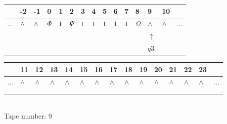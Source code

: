 \documentclass[11pt]{article}
\begin{document}
\begin{table}[H]
\centering
\begin{tabular}{lllllllllllllll}
 & -2 & -1 & 0 & 1 & 2 & 3 & 4 & 5 & 6 & 7 & 8 & 9 & 10 & \\
\hline
$...$ & \multicolumn{1}{|l|}{$\wedge$} & \multicolumn{1}{|l|}{$\wedge$} & \multicolumn{1}{|l|}{$\Phi$} & \multicolumn{1}{|l|}{$1$} & \multicolumn{1}{|l|}{$\Psi$} & \multicolumn{1}{|l|}{$1$} & \multicolumn{1}{|l|}{$1$} & \multicolumn{1}{|l|}{$1$} & \multicolumn{1}{|l|}{$1$} & \multicolumn{1}{|l|}{$1$} & \multicolumn{1}{|l|}{$\Omega$} & \multicolumn{1}{|l|}{$\wedge$} & \multicolumn{1}{|l|}{$\wedge$} & $...$\\
\hline
&  &  &  &  &  &  &  &  &  &  &  & $\uparrow$ &  &  \\
&  &  &  &  &  &  &  &  &  &  &  & $ q3 $ &  &  \\
\end{tabular}
\begin{tabular}{lllllllllllllll}
 & 11 & 12 & 13 & 14 & 15 & 16 & 17 & 18 & 19 & 20 & 21 & 22 & 23 & \\
\hline
$...$ & \multicolumn{1}{|l|}{$\wedge$} & \multicolumn{1}{|l|}{$\wedge$} & \multicolumn{1}{|l|}{$\wedge$} & \multicolumn{1}{|l|}{$\wedge$} & \multicolumn{1}{|l|}{$\wedge$} & \multicolumn{1}{|l|}{$\wedge$} & \multicolumn{1}{|l|}{$\wedge$} & \multicolumn{1}{|l|}{$\wedge$} & \multicolumn{1}{|l|}{$\wedge$} & \multicolumn{1}{|l|}{$\wedge$} & \multicolumn{1}{|l|}{$\wedge$} & \multicolumn{1}{|l|}{$\wedge$} & \multicolumn{1}{|l|}{$\wedge$} & $...$\\
\hline
&  &  &  &  &  &  &  &  &  &  &  &  &  &  \\
&  &  &  &  &  &  &  &  &  &  &  &  &  &  \\
\end{tabular}
\\
Tape number: 9
\noindent\makebox[\linewidth]{\hdashrule{\textwidth}{1pt}{1pt}}\end{table}
\end{document}
